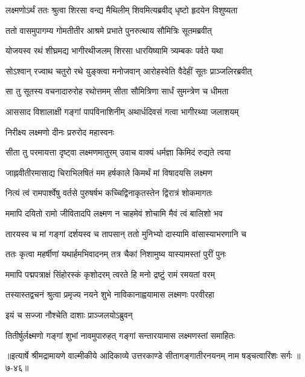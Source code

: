 \twolineshloka
{लक्ष्मणोऽर्थं ततः श्रुत्वा शिरसा वन्द्य मैथिलीम्}
{शिवमित्यब्रवीद् धृष्टो हृदयेन विशुष्यता} %

\twolineshloka
{ततो वासमुपागम्य गोमतीतीर आश्रमे}
{प्रभाते पुनरुत्थाय सौमित्रिः सूतमब्रवीत्} %

\twolineshloka
{योजयस्व रथं शीघ्रमद्य भागीरथीजलम्}
{शिरसा धारयिष्यामि त्र्यम्बकः पर्वते यथा} %

\twolineshloka
{सोऽश्वान् रज्वाथ चतुरो रथे युङ्क्त्वा मनोजवान्}
{आरोहस्वेति वैदेहीं सूतः प्राञ्जलिरब्रवीत्} %

\twolineshloka
{सा तु सूतस्य वचनादारुरोह रथोत्तमम्}
{सीता सौमित्रिणा सार्धं सुमन्त्रेण च धीमता} %

\twolineshloka
{आससाद विशालाक्षी गङ्गां पापविनाशिनीम्}
{अथार्धदिवसं गत्वा भागीरथ्या जलाशयम्} %

\onelineshloka
{निरीक्ष्य लक्ष्मणो दीनः प्ररुरोद महास्वनः} %

\twolineshloka
{सीता तु परमायत्ता दृष्ट्वा लक्ष्मणमातुरम्}
{उवाच वाक्यं धर्मज्ञा किमिदं रुद्यते त्वया} %

\twolineshloka
{जाह्नवीतीरमासाद्य चिराभिलषितं मम}
{हर्षकाले किमर्थं मां विषादयसि लक्ष्मण} %

\twolineshloka
{नित्यं त्वं रामपार्श्वेषु वर्तसे पुरुषर्षभ}
{कच्चिद्विनाकृतस्तेन द्विरात्रं शोकमागतः} %

\twolineshloka
{ममापि दयितो रामो जीवितादपि लक्ष्मण}
{न चाहमेवं शोचामि मैवं त्वं बालिशो भव} %

\twolineshloka
{तारयस्व च मां गङ्गां दर्शयस्व च तापसान्}
{ततो मुनिभ्यो दास्यामि वांसास्याभरणानि च} %

\twolineshloka
{ततः कृत्वा महर्षीणां यथार्हमभिवादनम्}
{तत्र चैकां निशामुष्य यास्यामस्तां पुरीं पुनः} %

\twolineshloka
{ममापि पद्मपत्राक्षं सिंहोरस्कं कृशोदरम्}
{त्वरते हि मनो द्रष्टुं रामं रमयतां वरम्} %

\twolineshloka
{तस्यास्तद्वचनं श्रुत्वा प्रमृज्य नयने शुभे}
{नाविकानाह्वयामास लक्ष्मणः परवीरहा} %

\onelineshloka
{इयं च सज्जा नौश्चेति दाशाः प्राञ्जलयोऽब्रुवन्} %

\twolineshloka
{तितीर्षुर्लक्ष्मणो गङ्गां शुभां नावमुपारुहत्}
{गङ्गां सन्तारयामास लक्ष्मणस्तां समाहितः} %


॥इत्यार्षे श्रीमद्रामायणे वाल्मीकीये आदिकाव्ये उत्तरकाण्डे सीतागङ्गातीरनयनम् नाम षड्चत्वारिंशः सर्गः ॥७-४६॥
